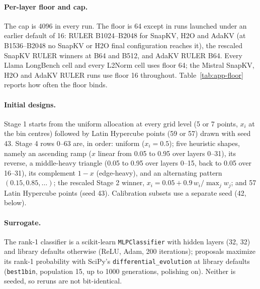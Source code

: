 \paragraph{Per-layer floor and cap.} The cap is 4096 in every run. The floor is 64 except in runs launched under an earlier default of 16: RULER B1024--B2048 for SnapKV, H2O and AdaKV (at B1536--B2048 no SnapKV or H2O final configuration reaches it), the rescaled SnapKV RULER winners at B64 and B512, and AdaKV RULER B64. Every Llama LongBench cell and every L2Norm cell uses floor 64; the Mistral SnapKV, H2O and AdaKV RULER runs use floor 16 throughout. Table~\ref{tab:app-floor} reports how often the floor binds.

\paragraph{Initial designs.} Stage 1 starts from the uniform allocation at every grid level (5 or 7 points, $x_i$ at the bin centres) followed by Latin Hypercube points (59 or 57) drawn with seed 43. Stage 4 rows 0--63 are, in order: uniform ($x_i = 0.5$); five heuristic shapes, namely an ascending ramp ($x$ linear from 0.05 to 0.95 over layers 0--31), its reverse, a middle-heavy triangle (0.05 to 0.95 over layers 0--15, back to 0.05 over 16--31), its complement $1-x$ (edge-heavy), and an alternating pattern $(0.15, 0.85, \dots)$; the rescaled Stage 2 winner, $x_i = 0.05 + 0.9\,w_i/\max_j w_j$; and 57 Latin Hypercube points (seed 43). Calibration subsets use a separate seed (42, below).

\paragraph{Surrogate.} The rank-1 classifier is a scikit-learn \texttt{MLPClassifier} with hidden layers (32, 32) and library defaults otherwise (ReLU, Adam, 200 iterations); proposals maximize its rank-1 probability with SciPy's \texttt{differential\_evolution} at library defaults (\texttt{best1bin}, population 15, up to 1000 generations, polishing on). Neither is seeded, so reruns are not bit-identical.

